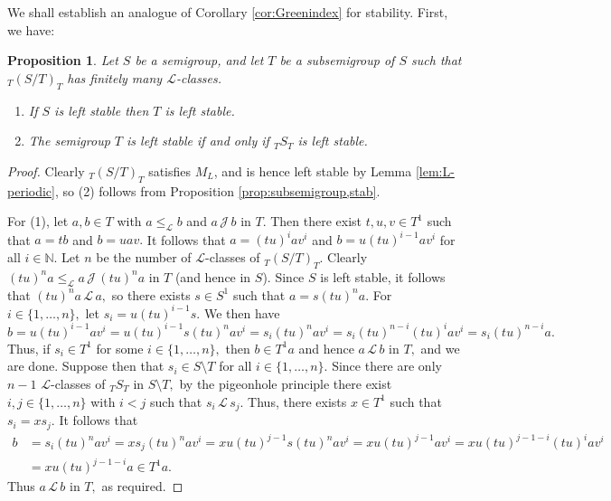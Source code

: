 \documentclass[twoside,a4paper,12pt,reqno]{amsart}
\theoremstyle{plain}
\newtheorem{prop}[thm]{Proposition}
\theoremstyle{definition}
\renewcommand{\l}{\mbox{${\mathcal{L}}$}}
\renewcommand{\j}{\mbox{${\mathcal{J}}$}}
\newcommand{\leql}{\leq_{\mathcal{L}}}
\newcommand{\geql}{\geq_{\mathcal{L}}}
\newcommand{\N}{\mathbb{N}}
\newcommand{\sm}{\setminus}
\begin{document}
We shall establish an analogue of Corollary \ref{cor:Greenindex} for stability.  First, we have:

\begin{prop}\label{prop:subsemigroup,L-classes}
Let $S$ be a semigroup, and let $T$ be a subsemigroup of $S$ such that ${_T}(S/T)_T$ has finitely many $\l$-classes.
\begin{enumerate}[leftmargin=*]
\item[\emph{(1)}] If $S$ is left stable then $T$ is left stable.
\item[\emph{(2)}] The semigroup $T$ is left stable if and only if ${_T}S_T$ is left stable.
\end{enumerate}
\end{prop}

\begin{proof}
Clearly ${_T}(S/T)_T$ satisfies $M_L$, and is hence left stable by Lemma \ref{lem:L-periodic}, so (2) follows from Proposition \ref{prop:subsemigroup,stab}.

For (1), let $a,b\in T$ with $a\leql b$ and $a\,\j\,b$ in $T.$  Then there exist $t,u,v\in T^1$ such that $a=tb$ and $b=uav.$  It follows that $a=(tu)^iav^i$ and $b=u(tu)^{i-1}av^i$ for all $i\in\N.$  Let $n$ be the number of $\l$-classes of ${_T}(S/T)_T$.  Clearly $(tu)^na\leql a\,\j\,(tu)^na$ in $T$ (and hence in $S$).  Since $S$ is left stable, it follows that $(tu)^na\,\l\,a,$ so there exists $s\in S^1$ such that $a=s(tu)^na.$  For $i\in\{1,\dots,n\},$ let $s_i=u(tu)^{i-1}s.$  We then have
$$b=u(tu)^{i-1}av^i=u(tu)^{i-1}s(tu)^nav^i=s_i(tu)^nav^i=s_i(tu)^{n-i}(tu)^iav^i=s_i(tu)^{n-i}a.$$
Thus, if $s_i\in T^1$ for some $i\in\{1,\dots,n\},$ then $b\in T^1a$ and hence $a\,\l\,b$ in $T,$ and we are done.  Suppose then that $s_i\in S{\sm}T$ for all $i\in\{1,\dots,n\}.$  Since there are only $n-1$ $\l$-classes of ${_T}S_T$ in $S{\sm}T,$ by the pigeonhole principle there exist $i,j\in\{1,\dots,n\}$ with $i<j$ such that $s_i\,\l\,s_j$.  Thus, there exists $x\in T^1$ such that $s_i=xs_j$.  It follows that
\begin{align*}
b&=s_i(tu)^nav^i=xs_j(tu)^nav^i=xu(tu)^{j-1}s(tu)^nav^i=xu(tu)^{j-1}av^i=xu(tu)^{j-1-i}(tu)^iav^i\\
&=xu(tu)^{j-1-i}a\in T^1a.
\end{align*}
Thus $a\,\l\,b$ in $T,$ as required.
\end{proof}
\end{document}
